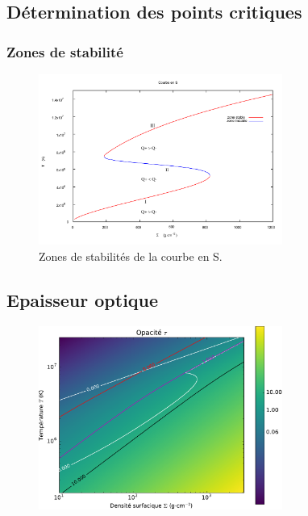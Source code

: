 \documentclass[french]{beamer}
\begin{document}

\begin{frame}
\section{Détermination des points critiques}
\frametitle{Zones de stabilité}

   \begin{figure}[htb!]
      \includegraphics[width=8cm]{figures/stable.pdf}
      \caption{Zones de stabilités de la courbe en S.}
    \end{figure}
\end{frame}


\begin{frame}
\section{Epaisseur optique}

   \begin{figure}[htb!]
      \includegraphics[width=8cm]{figures/tau_map.pdf}
   \end{figure}
\end{frame}
\end{document}
